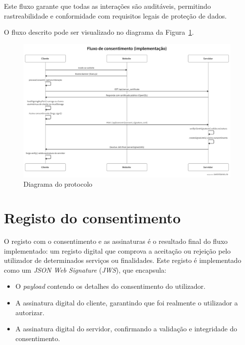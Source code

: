Este fluxo garante que todas as interações são auditáveis, permitindo rastreabilidade e conformidade com requisitos legais de proteção de dados.

O fluxo descrito pode ser visualizado no diagrama da Figura~\ref{fig:swimlane-solution}.

\begin{figure}[h]
\begin{center}
\includegraphics[width=1\textwidth]{images/swimlanes_solution.png}
\end{center}
\caption{Diagrama do protocolo}
\label{fig:swimlane-solution}
\end{figure}

\newpage

\section{Registo do consentimento}

O registo com o consentimento e as assinaturas é o resultado final do fluxo implementado: um registo digital que comprova a aceitação ou rejeição pelo utilizador de determinados serviços ou finalidades. Este registo é implementado como um \textit{JSON Web Signature} (\textit{JWS}), que encapsula:

\begin{itemize}
    \item O \textit{payload} contendo os detalhes do consentimento do utilizador.
    \item A assinatura digital do cliente, garantindo que foi realmente o utilizador a autorizar.
    \item A assinatura digital do servidor, confirmando a validação e integridade do consentimento.
\end{itemize}

